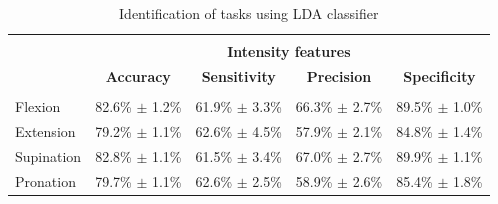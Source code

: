 \begin{table}[]
\centering
\caption{Identification of tasks using LDA classifier}
\label{tb:2-3}
\begin{tabular}{lcccc}
 & & & &\\
                          & \multicolumn{4}{c}{\large{\textbf{Intensity features}}}                                                                       \\
                          & \textbf{Accuracy}           & \textbf{Sensitivity}        & \textbf{Precision}          & \textbf{Specificity}        \\ \hline
                          &                             &                             &                             &                             \\
Flexion                   & 82.6\% $\pm$ 1.2\%          & 61.9\% $\pm$ 3.3\%          & 66.3\% $\pm$ 2.7\%          & 89.5\% $\pm$ 1.0\%          \\
Extension                 & 79.2\% $\pm$ 1.1\%          & 62.6\% $\pm$ 4.5\%          & 57.9\% $\pm$ 2.1\%          & 84.8\% $\pm$ 1.4\%          \\
Supination                & 82.8\% $\pm$ 1.1\%          & 61.5\% $\pm$ 3.4\%          & 67.0\% $\pm$ 2.7\%          & 89.9\% $\pm$ 1.1\%          \\
Pronation                 & 79.7\% $\pm$ 1.1\%          & 62.6\% $\pm$ 2.5\%          & 58.9\% $\pm$ 2.6\%          & 85.4\% $\pm$ 1.8\%          \\ \hline


\end{tabular}
\end{table}
